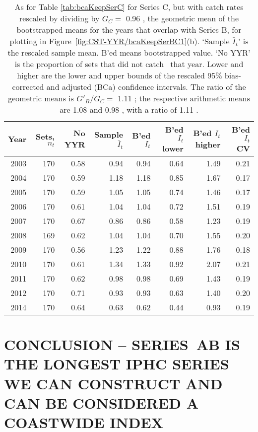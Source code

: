 \begin{table}[tp]
\centering
\caption{As for Table \ref{tab:bcaKeepSerC} for Series C, 
     but with catch rates rescaled by dividing
     by $G_{C}=$ 0.96 , 
     the geometric mean of the bootstrapped means for the years that overlap
     with Series B, for plotting in Figure~\ref{fig:CST-YYR/bcaKeepSerBC1}(b).
     `Sample $\bar{I}_t$' is the rescaled sample mean. B'ed means bootstrapped 
     value. `No YYR' is the proportion of sets that did not catch \spName~that
     year. Lower and higher are the 
     lower and upper bounds of the rescaled 
     95\% bias-corrected and adjusted (BCa)
     confidence intervals. The ratio of the geometric means is $G'_{B}/G_{C}=$ 1.11 ; the respective arithmetic means are  1.08  and 
      0.98 , with a ratio of  1.11 .} 
\label{tab:serCscaled}
\begin{tabular}{rrrrrrrr}
  \hline
Year & Sets, $n_t$ & No YYR & Sample $\bar{I}_t$ & B'ed $I_t$ & B'ed $I_t$ lower & B'ed $I_t$ higher & B'ed $I_t$ CV \\ 
  \hline
2003 & 170 & 0.58 & 0.94 & 0.94 & 0.64 & 1.49 & 0.21 \\ 
  2004 & 170 & 0.59 & 1.18 & 1.18 & 0.85 & 1.67 & 0.17 \\ 
  2005 & 170 & 0.59 & 1.05 & 1.05 & 0.74 & 1.46 & 0.17 \\ 
  2006 & 170 & 0.61 & 1.04 & 1.04 & 0.72 & 1.51 & 0.19 \\ 
  2007 & 170 & 0.67 & 0.86 & 0.86 & 0.58 & 1.23 & 0.19 \\ 
  2008 & 169 & 0.62 & 1.04 & 1.04 & 0.70 & 1.55 & 0.20 \\ 
  2009 & 170 & 0.56 & 1.23 & 1.22 & 0.88 & 1.76 & 0.18 \\ 
  2010 & 170 & 0.61 & 1.34 & 1.33 & 0.92 & 2.07 & 0.21 \\ 
  2011 & 170 & 0.62 & 0.98 & 0.98 & 0.69 & 1.43 & 0.19 \\ 
  2012 & 170 & 0.71 & 0.93 & 0.93 & 0.63 & 1.40 & 0.20 \\ 
  2014 & 170 & 0.64 & 0.63 & 0.62 & 0.44 & 0.93 & 0.19 \\ 
   \hline
\end{tabular}
\end{table}


\clearpage

\section{CONCLUSION -- SERIES~AB IS THE LONGEST IPHC SERIES WE CAN CONSTRUCT AND CAN BE CONSIDERED A COASTWIDE INDEX}

